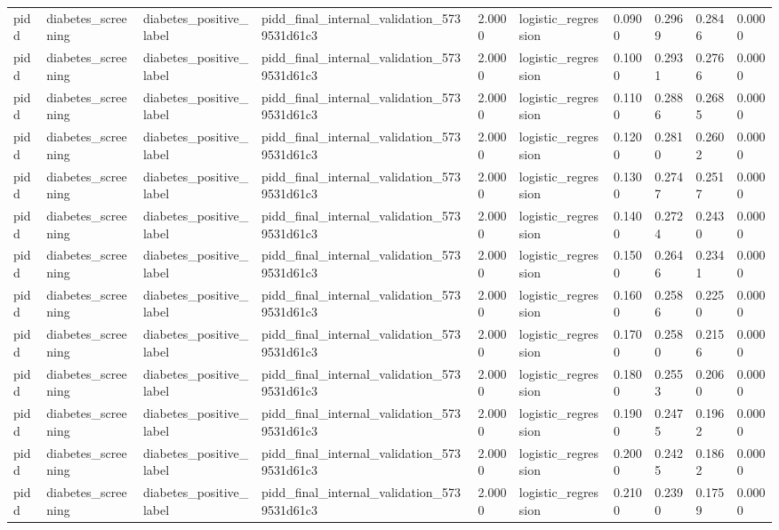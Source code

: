 \begin{tabular}{llllllllll}
pidd & diabetes\_screening & diabetes\_positive\_label & pidd\_final\_internal\_validation\_5739531d61c3 & 2.0000 & logistic\_regression & 0.0900 & 0.2969 & 0.2846 & 0.0000 \\
pidd & diabetes\_screening & diabetes\_positive\_label & pidd\_final\_internal\_validation\_5739531d61c3 & 2.0000 & logistic\_regression & 0.1000 & 0.2931 & 0.2766 & 0.0000 \\
pidd & diabetes\_screening & diabetes\_positive\_label & pidd\_final\_internal\_validation\_5739531d61c3 & 2.0000 & logistic\_regression & 0.1100 & 0.2886 & 0.2685 & 0.0000 \\
pidd & diabetes\_screening & diabetes\_positive\_label & pidd\_final\_internal\_validation\_5739531d61c3 & 2.0000 & logistic\_regression & 0.1200 & 0.2810 & 0.2602 & 0.0000 \\
pidd & diabetes\_screening & diabetes\_positive\_label & pidd\_final\_internal\_validation\_5739531d61c3 & 2.0000 & logistic\_regression & 0.1300 & 0.2747 & 0.2517 & 0.0000 \\
pidd & diabetes\_screening & diabetes\_positive\_label & pidd\_final\_internal\_validation\_5739531d61c3 & 2.0000 & logistic\_regression & 0.1400 & 0.2724 & 0.2430 & 0.0000 \\
pidd & diabetes\_screening & diabetes\_positive\_label & pidd\_final\_internal\_validation\_5739531d61c3 & 2.0000 & logistic\_regression & 0.1500 & 0.2646 & 0.2341 & 0.0000 \\
pidd & diabetes\_screening & diabetes\_positive\_label & pidd\_final\_internal\_validation\_5739531d61c3 & 2.0000 & logistic\_regression & 0.1600 & 0.2586 & 0.2250 & 0.0000 \\
pidd & diabetes\_screening & diabetes\_positive\_label & pidd\_final\_internal\_validation\_5739531d61c3 & 2.0000 & logistic\_regression & 0.1700 & 0.2580 & 0.2156 & 0.0000 \\
pidd & diabetes\_screening & diabetes\_positive\_label & pidd\_final\_internal\_validation\_5739531d61c3 & 2.0000 & logistic\_regression & 0.1800 & 0.2553 & 0.2060 & 0.0000 \\
pidd & diabetes\_screening & diabetes\_positive\_label & pidd\_final\_internal\_validation\_5739531d61c3 & 2.0000 & logistic\_regression & 0.1900 & 0.2475 & 0.1962 & 0.0000 \\
pidd & diabetes\_screening & diabetes\_positive\_label & pidd\_final\_internal\_validation\_5739531d61c3 & 2.0000 & logistic\_regression & 0.2000 & 0.2425 & 0.1862 & 0.0000 \\
pidd & diabetes\_screening & diabetes\_positive\_label & pidd\_final\_internal\_validation\_5739531d61c3 & 2.0000 & logistic\_regression & 0.2100 & 0.2390 & 0.1759 & 0.0000 \\

\end{tabular}

